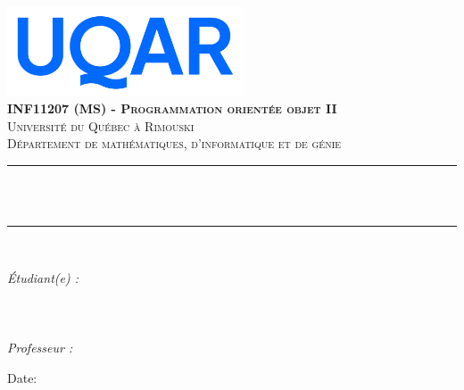 \begin{titlepage}

\newcommand{\HRule}{\rule{\linewidth}{0.5mm}} %





\begin{center} %


\includegraphics[width=7cm]{uqar}\\[1.5cm] 
\textbf{\textsc{\Large INF11207 (MS) - Programmation orientée objet II}}\\[1.0cm] 
\textsc{\Large Université du Québec à Rimouski}\\[0.5cm] 
\textsc{\large Département de mathématiques, d'informatique et de génie}\\[0.95cm] 


\HRule \\[0.4cm]
{ \huge \bfseries \reporttitle}\\ %
\HRule \\[1.5cm]
\end{center}

\begin{flushleft} \large
\textit{Étudiant(e) :}\\
\reportauthorOne \\ %
\reportauthorTwo \\
\reportauthorThree \\
\vspace{0.5cm}
\textit{Professeur :}\\
\reportProfessor
\end{flushleft}
\vspace{3.5cm}
\makeatletter
Date: \@date 

\vfill %



\makeatother


\end{titlepage}

